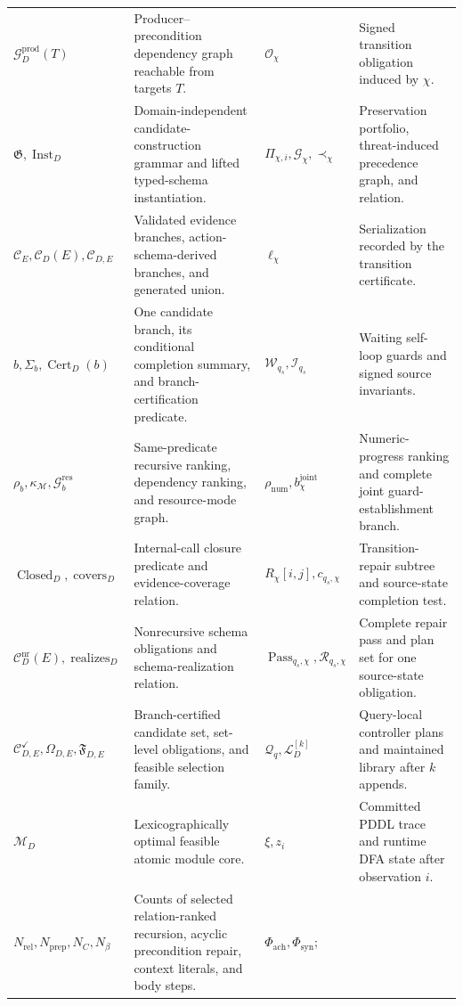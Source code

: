 \begin{table}[htbp]
\begin{tabular}{@{}
>{\raggedright\arraybackslash}p{}
>{\raggedright\arraybackslash}p{}
>{\raggedright\arraybackslash}p{}
>{\raggedright\arraybackslash}p{}@{}}
$\mathcal G_D^{\mathrm{prod}}(T)$ & Producer--precondition dependency graph
reachable from targets $T$. &
$\mathcal O_\chi$ & Signed transition obligation induced by $\chi$. \\
$\mathfrak G,\operatorname{Inst}_D$ & Domain-independent candidate-construction
grammar and lifted typed-schema instantiation. &
$\Pi_{\chi,i},\mathcal G_\chi,\prec_\chi$ & Preservation portfolio,
threat-induced precedence graph, and relation. \\
$\mathcal C_E,\mathcal C_D(E),\mathcal C_{D,E}$ & Validated evidence branches,
action-schema-derived branches, and generated union. &
$\boldsymbol\ell_\chi$ & Serialization recorded by the transition certificate. \\
$b,\Sigma_b,\operatorname{Cert}_D(b)$ & One candidate branch, its conditional
completion summary, and branch-certification predicate. &
$\mathcal W_{q_s},\mathcal I_{q_s}$ & Waiting self-loop guards and signed source
invariants. \\
$\rho_b,\kappa_{\mathcal M},\mathcal G_b^{\mathrm{res}}$ & Same-predicate recursive
ranking, dependency ranking, and resource-mode graph. &
$\rho_{\mathrm{num}},b_\chi^{\mathrm{joint}}$ & Numeric-progress ranking and
complete joint guard-establishment branch. \\
$\operatorname{Closed}_D,\operatorname{covers}_D$ & Internal-call closure
predicate and evidence-coverage relation. &
$R_\chi[i,j],c_{q_s,\chi}$ & Transition-repair subtree and source-state
completion test. \\
$\mathcal C_D^{\mathrm{nr}}(E),\operatorname{realizes}_D$ & Nonrecursive
schema obligations and schema-realization relation. &
$\operatorname{Pass}_{q_s,\chi},\mathcal R_{q_s,\chi}$ & Complete repair pass
and plan set for one source-state obligation. \\
$\mathcal C^{\checkmark}_{D,E},\Omega_{D,E},\mathfrak F_{D,E}$ & Branch-certified
candidate set, set-level obligations, and feasible selection family. &
$\mathcal Q_q,\mathcal L_D^{[k]}$ & Query-local controller plans and maintained
library after $k$ appends. \\
$\mathcal M_D$ & Lexicographically optimal feasible atomic module core. &
$\xi,z_i$ & Committed PDDL trace and runtime DFA state after observation $i$. \\
$N_{\mathrm{rel}},N_{\mathrm{prep}},N_C,N_\beta$ & Counts of selected
relation-ranked recursion, acyclic precondition repair, context literals, and
body steps. &
$\Phi_{\mathrm{ach}},\Phi_{\mathrm{syn}}$; \newline

\end{tabular}
\end{table}
